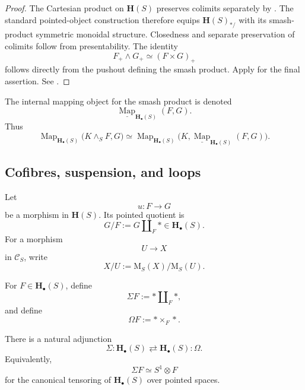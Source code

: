 \begin{proof}
The Cartesian product on \(\mathbf H(S)\) preserves colimits separately
by
.
The standard pointed-object construction therefore equips
\(\mathbf H(S)_{*/}\) with its smash-product symmetric monoidal
structure.  Closedness and separate preservation of colimits follow
from presentability.  The identity
\[
    F_+\wedge G_+
    \simeq
    (F\times G)_+
\]
follows directly from the pushout defining the smash product.  Apply
for the final assertion.  See \cite{LurieHA}.
\end{proof}

\begin{notation}
\label{not:pointed-motivic-internal-map}
The internal mapping object for the smash product is denoted
\[
    \underline{\operatorname{Map}}_{\mathbf H_\bullet(S)}(F,G).
\]
Thus
\[
    \operatorname{Map}_{\mathbf H_\bullet(S)}
    \bigl(
        K\wedge_SF,
        G
    \bigr)
    \simeq
    \operatorname{Map}_{\mathbf H_\bullet(S)}
    \bigl(
        K,
        \underline{\operatorname{Map}}_{\mathbf H_\bullet(S)}(F,G)
    \bigr).
\]
\end{notation}

\subsection{Cofibres, suspension, and loops}

\begin{definition}
\label{def:motivic-quotient}
Let
\[
    u
    \colon
    F
    \longrightarrow
    G
\]
be a morphism in \(\mathbf H(S)\).  Its pointed quotient is
\[
    G/F
    :=
    G
    \amalg_F
    *
    \in
    \mathbf H_\bullet(S).
\]
For a morphism
\[
    U
    \longrightarrow
    X
\]
in \(\mathcal C_S\), write
\[
    X/U
    :=
    \mathrm M_S(X)/
    \mathrm M_S(U).
\]
\end{definition}

\begin{definition}
\label{def:motivic-suspension-loop}
For \(F\in\mathbf H_\bullet(S)\), define
\[
    \Sigma F
    :=
    *
    \amalg_F
    *,
\]
and define
\[
    \Omega F
    :=
    *
    \times_F
    *.
\]
\end{definition}

\begin{proposition}
\label{prop:motivic-suspension-loop-adjunction}
There is a natural adjunction
\[
    \Sigma
    \colon
    \mathbf H_\bullet(S)
    \rightleftarrows
    \mathbf H_\bullet(S)
    :
    \Omega.
\]
Equivalently,
\[
    \Sigma F
    \simeq
    S^1\otimes F
\]
for the canonical tensoring of
\(\mathbf H_\bullet(S)\) over pointed spaces.
\end{proposition}

